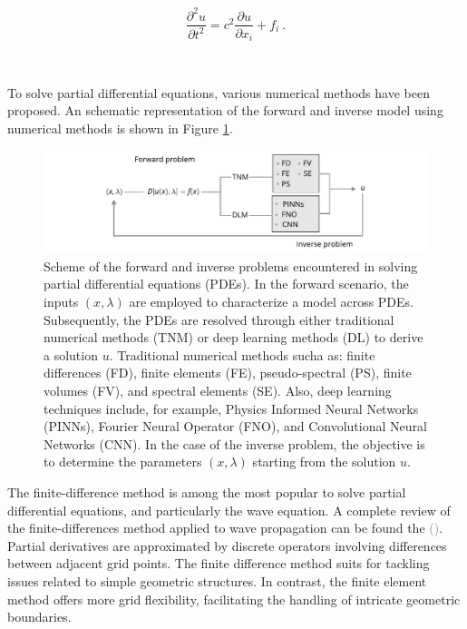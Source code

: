 \documentclass{tufte-handout}
\renewcommand{\citeauthoryear}[2][]{\textcolor{gray}{\citeauthor{#2} (\textcolor{gray}{\citeyear[#1]{#2}})}}
\begin{document}
\begin{equation}
\frac{\partial^2 u}{\partial t^2} =  c^{2} \frac{\partial u}{\partial x_i} + f_i  \ .
\label{acustic}
\end{equation}

\

To solve partial differential equations, various numerical methods have been proposed. An schematic representation of the forward and inverse model using numerical methods is shown in Figure \ref{fig:forward_inverse}.

\begin{figure}
    \includegraphics[scale=1]{figs/forward_inverse_modeling.pdf}
    \caption{Scheme of the forward and inverse problems encountered in solving partial differential equations (PDEs). In the forward scenario, the inputs $(x,\lambda)$ are employed to characterize a model across PDEs. Subsequently, the PDEs are resolved through either traditional numerical methods (TNM) or deep learning methods (DL) to derive a solution $u$. Traditional numerical methods sucha as: finite differences (FD), finite elements (FE), pseudo-spectral (PS), finite volumes (FV), and spectral elements (SE). Also, deep learning techniques include, for example, Physics Informed Neural Networks (PINNs), Fourier Neural Operator (FNO), and Convolutional Neural Networks (CNN). In the case of the inverse problem, the objective is to determine the parameters $(x,\lambda)$ starting from the solution $u$.}
    \label{fig:forward_inverse}
\end{figure}

The finite-difference method is among the most popular to solve partial differential equations, and particularly the wave equation. A complete review of the finite-differences method applied to wave propagation can be found the \citeauthoryear{Moczo2014}. Partial derivatives are approximated by discrete operators involving differences between adjacent grid points. The finite difference method suits for tackling issues related to simple geometric structures. In contrast, the finite element method offers more grid flexibility, facilitating the handling of intricate geometric boundaries.
\end{document}
